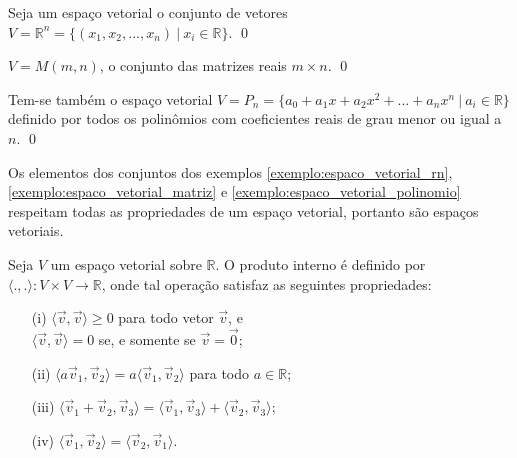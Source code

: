     \begin{exemplo}
    \label{exemplo:espaco_vetorial_rn}
        Seja um espaço vetorial o conjunto de vetores $V = \mathbb{R}^{n} = \{(x_1, x_2, ... , x_n)\ |\ x_i \in \mathbb{R}\}$.
    \qed
    \end{exemplo}

    \begin{exemplo}
    \label{exemplo:espaco_vetorial_matriz}
        $V = M(m,n)$, o conjunto das matrizes reais $m \times n$.
    \qed
    \end{exemplo}

    \begin{exemplo}
    \label{exemplo:espaco_vetorial_polinomio}
        Tem-se também o espaço vetorial $V = P_n = \{a_0 + a_1 x + a_2 x^2 + ... + a_n x^n\ |\ a_i \in \mathbb{R}\}$ definido por todos os polinômios com coeficientes reais de grau menor ou igual a $n$.
    \qed
    \end{exemplo}
    
    Os elementos dos conjuntos dos exemplos \ref{exemplo:espaco_vetorial_rn},\ref{exemplo:espaco_vetorial_matriz} e \ref{exemplo:espaco_vetorial_polinomio} respeitam todas as propriedades de um espaço vetorial, portanto são espaços vetoriais.

\begin{definition}
    Seja $V$ um espaço vetorial sobre $\mathbb{R}$. O produto interno é definido por $\langle .,. \rangle : V \times V \rightarrow \mathbb{R}$, onde tal operação satisfaz as seguintes propriedades:

    \begin{itemize}
        \item[(i)] $\langle \vec{v},\vec{v} \rangle \ge 0$ para todo vetor $\vec{v}$, e\\ $\langle \vec{v},\vec{v} \rangle = 0$ se, e somente se $\vec{v} = \vec{0}$;
        \item[(ii)] $\langle a\vec{v}_1,\vec{v}_2 \rangle = a\langle \vec{v}_1,\vec{v}_2 \rangle$ para todo $a \in \mathbb{R}$;
        \item[(iii)] $\langle \vec{v}_1 + \vec{v}_2,\vec{v}_3 \rangle = \langle \vec{v}_1,\vec{v}_3 \rangle + \langle \vec{v}_2,\vec{v}_3 \rangle$;
        \item[(iv)] $\langle \vec{v}_1,\vec{v}_2 \rangle = \langle \vec{v}_2,\vec{v}_1 \rangle$.
    \end{itemize}
    
\end{definition}

